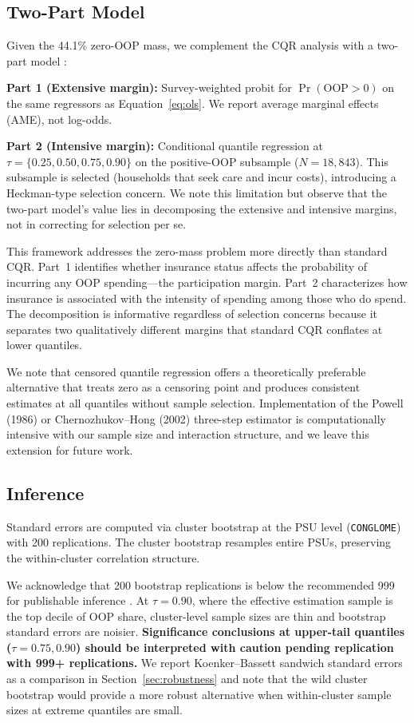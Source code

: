 \subsection{Two-Part Model}

Given the 44.1\% zero-OOP mass, we complement the CQR analysis with a two-part model \citep{Manning1987}:

\textbf{Part 1 (Extensive margin):} Survey-weighted probit for $\Pr(\text{OOP} > 0)$ on the same regressors as Equation~\ref{eq:ols}. We report average marginal effects (AME), not log-odds.

\textbf{Part 2 (Intensive margin):} Conditional quantile regression at $\tau = \{0.25, 0.50, 0.75, 0.90\}$ on the positive-OOP subsample ($N = 18{,}843$). This subsample is selected (households that seek care and incur costs), introducing a Heckman-type selection concern. We note this limitation but observe that the two-part model's value lies in decomposing the extensive and intensive margins, not in correcting for selection per se.

This framework addresses the zero-mass problem more directly than standard CQR. Part~1 identifies whether insurance status affects the probability of incurring any OOP spending---the participation margin. Part~2 characterizes how insurance is associated with the intensity of spending among those who do spend. The decomposition is informative regardless of selection concerns because it separates two qualitatively different margins that standard CQR conflates at lower quantiles.

We note that censored quantile regression \citep{Powell1986, Chernozhukov2002} offers a theoretically preferable alternative that treats zero as a censoring point and produces consistent estimates at all quantiles without sample selection. Implementation of the Powell (1986) or Chernozhukov--Hong (2002) three-step estimator is computationally intensive with our sample size and interaction structure, and we leave this extension for future work.

\subsection{Inference}

Standard errors are computed via cluster bootstrap at the PSU level (\texttt{CONGLOME}) with 200 replications. The cluster bootstrap resamples entire PSUs, preserving the within-cluster correlation structure.

We acknowledge that 200 bootstrap replications is below the recommended 999 for publishable inference \citep{Cameron2008}. At $\tau = 0.90$, where the effective estimation sample is the top decile of OOP share, cluster-level sample sizes are thin and bootstrap standard errors are noisier. \textbf{Significance conclusions at upper-tail quantiles ($\tau = 0.75, 0.90$) should be interpreted with caution pending replication with 999+ replications.} We report Koenker--Bassett sandwich standard errors as a comparison in Section~\ref{sec:robustness} and note that the wild cluster bootstrap \citep{Roodman2019} would provide a more robust alternative when within-cluster sample sizes at extreme quantiles are small.

